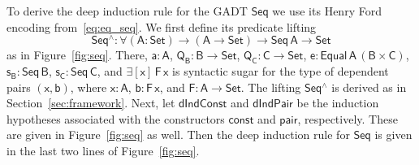 \documentclass[sigplan,10pt]{acmart}
\begin{document}
To derive the deep induction rule for the GADT $\mathsf{Seq}$ we use
its Henry Ford encoding from~\eqref{eq:eq_seq}.  We first define its
predicate lifting
\[\mathsf{Seq^\wedge : \forall (A : Set) \to (A \to
  Set) \to Seq\,A \to Set}\] as in Figure~\ref{fig:seq}. There,
$\mathsf{a : A}$, $\mathsf{Q_B : B \to Set}$, $\mathsf{Q_C : C \to
  Set}$, $\mathsf{e : Equal\,A\,(B \times C)}$, $\mathsf{s_B :
  Seq\,B}$, $\mathsf{s_C : Seq\,C}$, and $\mathsf{\exists [x]\, F
  \,x}$ is syntactic sugar for the type of dependent pairs
$\mathsf{(x,b)}$, where $\mathsf{x : A}$, $\mathsf{b : F\, x}$, and
$\mathsf{F : A \to Set}$.  The lifting $\mathsf{Seq^\wedge}$ is
derived as in Section~\ref{sec:framework}. Next, let
$\mathsf{dIndConst}$ and $\mathsf{dIndPair}$ be the induction
hypotheses associated with the constructors $\mathsf{const}$ and
$\mathsf{pair}$, respectively. These are given in Figure~\ref{fig:seq}
as well. Then the deep induction rule for $\mathsf{Seq}$ is given in
the last two lines of Figure~\ref{fig:seq}.
\end{document}
